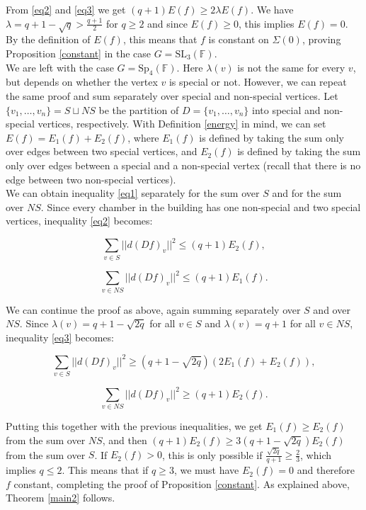 \documentclass{article}
\theoremstyle{definition}
\theoremstyle{remark}
\theoremstyle{plain}
\begin{document}
From \eqref{eq2} and \eqref{eq3} we get $(q+1)E(f)\geq 2\lambda E(f)$. We have $\lambda=q+1-\sqrt{q}>\frac{q+1}{2}$ for $q\geq 2$ and since $E(f)\geq 0$, this implies $E(f)=0$. By the definition of $E(f)$, this means that $f$ is constant on $\Sigma(0)$, proving Proposition \ref{constant} in the case $G=\mathrm{SL}_3(\mathbb{F})$. \\

We are left with the case $G=\mathrm{Sp}_4(\mathbb{F})$. Here $\lambda(v)$ is not the same for every $v$, but depends on whether the vertex $v$ is special or not. However, we can repeat the same proof and sum separately over special and non-special vertices. Let $\{v_1,\ldots,v_n\}=S\sqcup NS$ be the partition of $D=\{v_1,\ldots,v_n\}$ into special and non-special vertices, respectively. With Definition \ref{energy} in mind, we can set $E(f)=E_1(f)+E_2(f)$, where $E_1(f)$ is defined by taking the sum only over edges between two special vertices, and $E_2(f)$ is defined by taking the sum only over edges between a special and a non-special vertex (recall that there is no edge between two non-special vertices). \\

We can obtain inequality \eqref{eq1} separately for the sum over $S$ and for the sum over $NS$. Since every chamber in the building has one non-special and two special vertices, inequality \eqref{eq2} becomes:

\begin{equation*}
    \sum_{v\in S}{||d(Df)_v||^2}\leq (q+1)E_2(f),
\end{equation*}

\begin{equation*}
    \sum_{v\in NS}{||d(Df)_v||^2}\leq (q+1)E_1(f).
\end{equation*}

We can continue the proof as above, again summing separately over $S$ and over $NS$. Since $\lambda(v)=q+1-\sqrt{2q}$ for all $v\in S$ and $\lambda(v)=q+1$ for all $v\in NS$, inequality \eqref{eq3} becomes:

\begin{equation*}
    \sum_{v\in S}{||d(Df)_v||^2}\geq(q+1-\sqrt{2q})(2E_1(f)+E_2(f)),
\end{equation*}

\begin{equation*}
    \sum_{v\in NS}{||d(Df)_v||^2}\geq(q+1)E_2(f).
\end{equation*}

Putting this together with the previous inequalities, we get $E_1(f)\geq E_2(f)$ from the sum over $NS$, and then $(q+1)E_2(f)\geq 3(q+1-\sqrt{2q})E_2(f)$ from the sum over $S$. If $E_2(f)>0$, this is only possible if $\frac{\sqrt{2q}}{q+1}\geq\frac{2}{3}$, which implies $q\leq 2$. This means that if $q\geq 3$, we must have $E_2(f)=0$ and therefore $f$ constant, completing the proof of Proposition \ref{constant}. As explained above, Theorem \ref{main2} follows. \\
\end{document}
